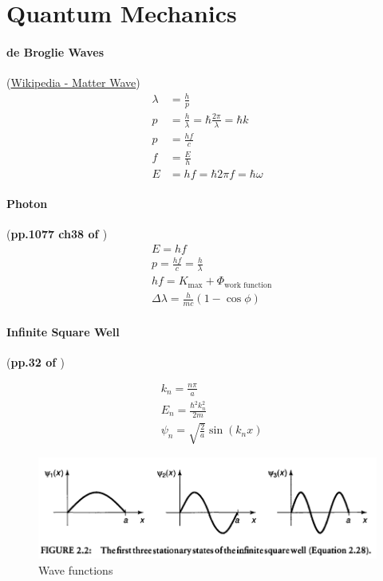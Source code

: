 \documentclass{article}
\numberwithin{equation}{subsection} %
\theoremstyle{definition}
\begin{document}
\section{Quantum Mechanics}
\label{sec:Quantum-Mechanics}

\paragraph{de Broglie Waves}
(\href{https://en.wikipedia.org/wiki/Matter_wave}{Wikipedia - Matter
Wave})
\begin{align}
    \lambda &= \frac{h}{p} \\
    p &= \frac{h}{\lambda} = \hbar\frac{2\pi}{\lambda} = \hbar k \\
    p &= \frac{hf}{c} \\
    f &= \frac{E}{h} \\
    E &= hf = \hbar2\pi f = \hbar\omega
\end{align}
\paragraph{Photon} (\textbf{pp.1077 ch38 of \cite{book}})
\begin{align}
    & E = h f \\
    & p= \frac{hf}{c} = \frac{h}{\lambda} \\
    & hf = K_\text{max} + \Phi_\text{work function} \\
    & \Delta\lambda = \frac{h}{mc}(1-\cos{\phi})
\end{align}

\paragraph{Infinite Square Well} (\textbf{pp.32 of \cite{Griffiths_QM}})

\begin{align}
    & k_n = \frac{n\pi}{a} \\
    & E_n = \frac{\hbar^2 k_n^2}{2m} \\
    & \psi_n = \sqrt{\frac{2}{a}} \sin(k_n x)
\end{align}
\begin{figure}[H]
    \centering
    \includegraphics[width=0.8\linewidth]{pics/qm_infinite_square_well.PNG}
    \caption{Wave functions}
\end{figure}
\end{document}
